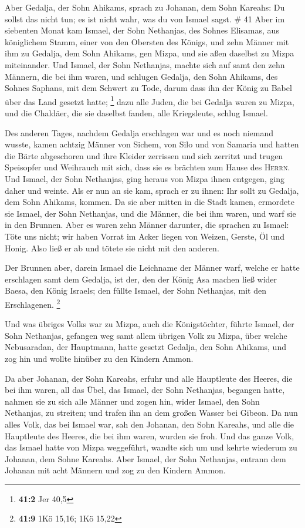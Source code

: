  Aber Gedalja, der Sohn Ahikams, sprach zu Johanan, dem
Sohn Kareahs: Du sollst das nicht tun; es ist nicht wahr, was du von
Ismael sagst. \# 41  Aber im siebenten Monat kam Ismael,
der Sohn Nethanjas, des Sohnes Elisamas, aus königlichem Stamm, einer
von den Obersten des Königs, und zehn Männer mit ihm zu Gedalja, dem
Sohn Ahikams, gen Mizpa, und sie aßen daselbst zu Mizpa miteinander.
 Und Ismael, der Sohn Nethanjas, machte sich auf samt den
zehn Männern, die bei ihm waren, und schlugen Gedalja, den Sohn Ahikams,
des Sohnes Saphans, mit dem Schwert zu Tode, darum dass ihn der König zu
Babel über das Land gesetzt hatte; \footnote{\textbf{41:2} Jer 40,5}
 dazu alle Juden, die bei Gedalja waren zu Mizpa, und die
Chaldäer, die sie daselbst fanden, alle Kriegsleute, schlug Ismael.

 Des anderen Tages, nachdem Gedalja erschlagen war und es
noch niemand wusste,  kamen achtzig Männer von Sichem, von
Silo und von Samaria und hatten die Bärte abgeschoren und ihre Kleider
zerrissen und sich zerritzt und trugen Speisopfer und Weihrauch mit
sich, dass sie es brächten zum Hause des \textsc{Herrn}. 
Und Ismael, der Sohn Nethanjas, ging heraus von Mizpa ihnen entgegen,
ging daher und weinte. Als er nun an sie kam, sprach er zu ihnen: Ihr
sollt zu Gedalja, dem Sohn Ahikams, kommen.  Da sie aber
mitten in die Stadt kamen, ermordete sie Ismael, der Sohn Nethanjas, und
die Männer, die bei ihm waren, und warf sie in den Brunnen.
 Aber es waren zehn Männer darunter, die sprachen zu
Ismael: Töte uns nicht; wir haben Vorrat im Acker liegen von Weizen,
Gerste, Öl und Honig. Also ließ er ab und tötete sie nicht mit den
anderen.

 Der Brunnen aber, darein Ismael die Leichname der Männer
warf, welche er hatte erschlagen samt dem Gedalja, ist der, den der
König Asa machen ließ wider Baesa, den König Israels; den füllte Ismael,
der Sohn Nethanjas, mit den Erschlagenen. \footnote{\textbf{41:9} 1Kö
  15,16; 1Kö 15,22}

 Und was übriges Volks war zu Mizpa, auch die
Königstöchter, führte Ismael, der Sohn Nethanjas, gefangen weg samt
allem übrigen Volk zu Mizpa, über welche Nebusaradan, der Hauptmann,
hatte gesetzt Gedalja, den Sohn Ahikams, und zog hin und wollte hinüber
zu den Kindern Ammon.

 Da aber Johanan, der Sohn Kareahs, erfuhr und alle
Hauptleute des Heeres, die bei ihm waren, all das Übel, das Ismael, der
Sohn Nethanjas, begangen hatte,  nahmen sie zu sich alle
Männer und zogen hin, wider Ismael, den Sohn Nethanjas, zu streiten; und
trafen ihn an dem großen Wasser bei Gibeon.  Da nun alles
Volk, das bei Ismael war, sah den Johanan, den Sohn Kareahs, und alle
die Hauptleute des Heeres, die bei ihm waren, wurden sie froh.
 Und das ganze Volk, das Ismael hatte von Mizpa
weggeführt, wandte sich um und kehrte wiederum zu Johanan, dem Sohne
Kareahs.  Aber Ismael, der Sohn Nethanjas, entrann dem
Johanan mit acht Männern und zog zu den Kindern Ammon.

